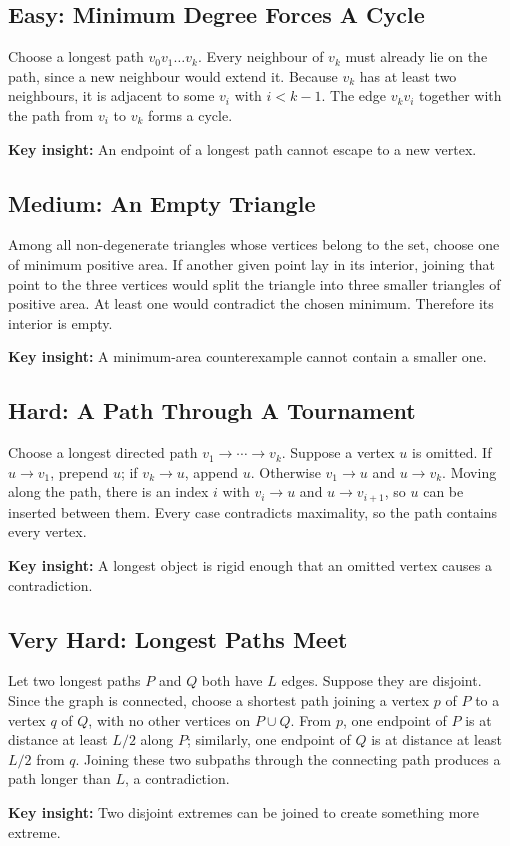 \documentclass[12pt]{article}
\newcommand{\insight}[1]{\par\medskip\noindent\textbf{Key insight:} #1}
\begin{document}
\subsection*{Easy: Minimum Degree Forces A Cycle}
Choose a longest path $v_0v_1\ldots v_k$. Every neighbour of $v_k$
must already lie on the path, since a new neighbour would extend it.
Because $v_k$ has at least two neighbours, it is adjacent to some
$v_i$ with $i<k-1$. The edge $v_kv_i$ together with the path from
$v_i$ to $v_k$ forms a cycle.
\insight{An endpoint of a longest path cannot escape to a new vertex.}

\subsection*{Medium: An Empty Triangle}
Among all non-degenerate triangles whose vertices belong to the set,
choose one of minimum positive area. If another given point lay in
its interior, joining that point to the three vertices would split
the triangle into three smaller triangles of positive area. At least
one would contradict the chosen minimum. Therefore its interior is empty.
\insight{A minimum-area counterexample cannot contain a smaller one.}

\subsection*{Hard: A Path Through A Tournament}
Choose a longest directed path $v_1\to\cdots\to v_k$. Suppose a
vertex $u$ is omitted. If $u\to v_1$, prepend $u$; if $v_k\to u$,
append $u$. Otherwise $v_1\to u$ and $u\to v_k$. Moving along the
path, there is an index $i$ with $v_i\to u$ and $u\to v_{i+1}$, so
$u$ can be inserted between them. Every case contradicts maximality,
so the path contains every vertex.
\insight{A longest object is rigid enough that an omitted vertex causes a contradiction.}

\subsection*{Very Hard: Longest Paths Meet}
Let two longest paths $P$ and $Q$ both have $L$ edges. Suppose they
are disjoint. Since the graph is connected, choose a shortest path
joining a vertex $p$ of $P$ to a vertex $q$ of $Q$, with no other
vertices on $P\cup Q$. From $p$, one endpoint of $P$ is at distance
at least $L/2$ along $P$; similarly, one endpoint of $Q$ is at
distance at least $L/2$ from $q$. Joining these two subpaths through
the connecting path produces a path longer than $L$, a contradiction.
\insight{Two disjoint extremes can be joined to create something more extreme.}
\end{document}
